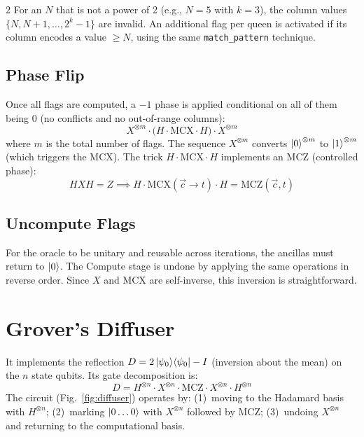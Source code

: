 \documentclass[9pt, a4paper]{extarticle}
\begin{document}
\begin{multicols}{2}
For an $N$ that is not a power of 2 (e.g., $N = 5$ with $k = 3$), the column values $\{N, N{+}1, \ldots, 2^k{-}1\}$ are invalid. An additional flag per queen is activated if its column encodes a value $\geq N$, using the same \texttt{match\_pattern} technique.

\subsection{Phase Flip}

Once all flags are computed, a $-1$ phase is applied conditional on all of them being 0 (no conflicts and no out-of-range columns):
\begin{equation}
    X^{\otimes m}\!\cdot\!\big(H\!\cdot\!\text{MCX}\!\cdot\!H\big)\!\cdot\!X^{\otimes m}
\end{equation}
where $m$ is the total number of flags. The sequence $X^{\otimes m}$ converts $\ket{0}^{\otimes m}$ to $\ket{1}^{\otimes m}$ (which triggers the MCX). The trick $H \cdot \text{MCX} \cdot H$ implements an MCZ (controlled phase):
\begin{equation}
    HXH = Z \implies H \cdot \text{MCX}(\vec{c} \to t) \cdot H = \text{MCZ}(\vec{c}, t)
\end{equation}

\subsection{Uncompute Flags}

For the oracle to be unitary and reusable across iterations, the ancillas must return to $\ket{0}$. The Compute stage is undone by applying the same operations in reverse order. Since $X$ and MCX are self-inverse, this inversion is straightforward.

\section{Grover's Diffuser}

It implements the reflection $D = 2\ket{\psi_0}\!\bra{\psi_0} - I$ (inversion about the mean) on the $n$ state qubits. Its gate decomposition is:
\begin{equation}
    D = H^{\otimes n}\!\cdot\!X^{\otimes n}\!\cdot\!\text{MCZ}
        \!\cdot\!X^{\otimes n}\!\cdot\!H^{\otimes n}
\end{equation}
The circuit (Fig.~\ref{fig:diffuser}) operates by: (1)~moving to the Hadamard basis with $H^{\otimes n}$; (2)~marking $\ket{0\ldots 0}$ with $X^{\otimes n}$ followed by MCZ; (3)~undoing $X^{\otimes n}$ and returning to the computational basis.


\end{multicols}
\end{document}
